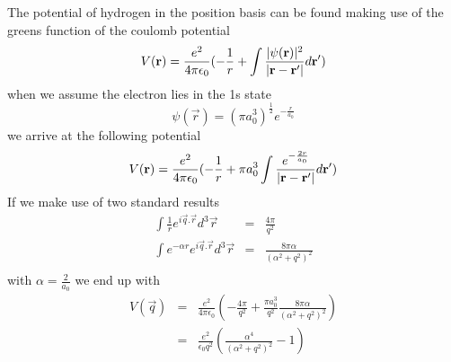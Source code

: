 The potential of hydrogen
in the position basis can be found
making use of the greens
function of the coulomb potential\cite{AQP_Problems}
\begin{equation}
    V(\mathbf{r}) = \frac{e^2}{4 \pi \epsilon_0}(
    -\frac{1}{r}
    + \int{\frac{\lvert\psi(\mathbf{r})\rvert^2}{
            \lvert\mathbf{r} - \mathbf{r'}\rvert} d\mathbf{r}'})
\end{equation}
when we assume the electron
lies in the 1s state\cite{griffiths_schroeter_2018}
\begin{equation}
    \psi(\vec{r}) = {(\pi a_0^3)}^{\frac{1}{2}} e^{-\frac{r}{a_0}}
\end{equation}
we arrive at the following potential
\begin{equation}
    V(\mathbf{r}) = \frac{e^2}{4 \pi \epsilon_0}(
    -\frac{1}{r}
    + \pi a_0^3\int{\frac{e^{-\frac{2r}{a_0}}}{
            \lvert\mathbf{r} - \mathbf{r'}\rvert} d\mathbf{r}'})
\end{equation}
If we make use of two standard results
\begin{eqnarray}
    \int{\frac{1}{r} e^{i\vec{q}.\vec{r}} d^3\vec{r}}
    &=& \frac{4 \pi}{q^2}\\
    \int{e^{-\alpha r} e^{i\vec{q}.\vec{r}} d^3\vec{r}}
    &=& \frac{8 \pi \alpha}{{(\alpha^2 + q^2)}^2}\\
\end{eqnarray}
with \(\alpha = \frac{2}{a_0}\) we end up
with
\begin{eqnarray}
    V(\vec{q}) &=& \frac{e^2}{4 \pi \epsilon_0}(
    - \frac{4\pi}{q^2}
    + \frac{\pi a_0^3}{q^2}
    \frac{8 \pi \alpha}{{(\alpha^2 + q^2)}^2})\\
    &=& \frac{e^2}{\epsilon_0 q^2}(
    \frac{ \alpha^4}{{(\alpha^2 + q^2)}^2} - 1
    )
\end{eqnarray}